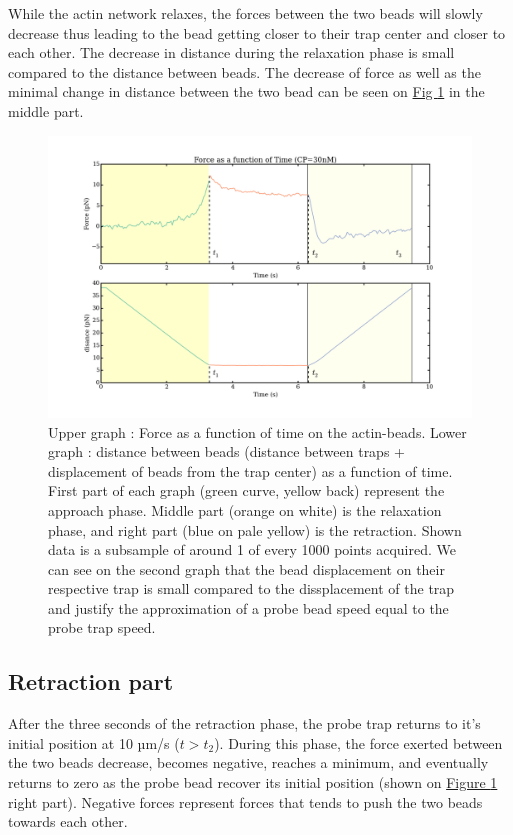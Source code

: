 \documentclass[A4paperpaper,11pt,english]{sphinxmanual}
\begin{document}
While the actin network relaxes, the forces between the two beads will slowly
decrease thus leading to the bead getting closer to their trap center and
closer to each other. The decrease in distance during the relaxation phase is
small compared to the distance between beads. The decrease of force as well as
the minimal change in distance between the two bead can be seen on \hyperref[parts/part3:figindent-time]{Fig  \ref*{parts/part3:figindent-time}}
in the middle part.
\begin{figure}[htbp]
\centering
\capstart

\includegraphics[width=0.900\linewidth]{force_time.png}
\caption{Upper graph : Force as a function of time on the actin-beads.  Lower graph
: distance between beads (distance between traps + displacement of beads
from the trap center) as a function of time. First part of each graph
(green curve, yellow back) represent the approach phase. Middle part
(orange on white) is the relaxation phase, and right part (blue on pale
yellow) is the retraction.  Shown data is a subsample of around 1 of every
1000 points acquired. We can see on the second graph that the bead
displacement on their respective trap is small compared to the
dissplacement of the trap and justify the approximation of a probe bead
speed equal to the probe trap speed.}\label{parts/part3:figindent-time}\end{figure}


\subsection{Retraction part}
\label{parts/part3:retraction-part}
After the three seconds of the retraction phase, the probe trap returns to it's
initial position at 10 µm/s (\(t > t_2\)). During this phase, the force
exerted between the two beads decrease, becomes negative, reaches a minimum, and
eventually returns to zero as the probe bead recover its initial
position (shown on \hyperref[parts/part3:figindent-time]{Figure  \ref*{parts/part3:figindent-time}} right part). Negative forces
represent forces that tends to push the two beads towards each other.
\end{document}
